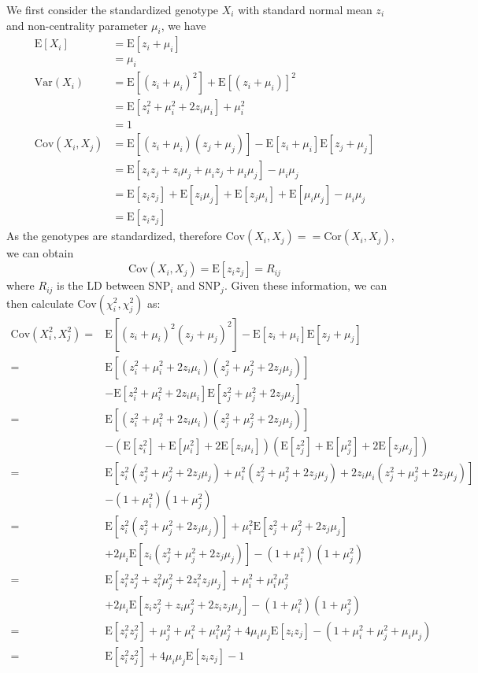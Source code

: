 			We first consider the standardized genotype $X_i$ with standard normal mean $z_i$ and non-centrality parameter
			$\mu_i$, we have
			\begin{align*}
				\mathrm{E}[X_i]&=\mathrm{E}[z_i+\mu_i]\\
				&=\mu_i\\
				\mathrm{Var}(X_i) &=\mathrm{E}[(z_i+\mu_i)^2]+\mathrm{E}[(z_i+\mu_i)]^2\\
				&=\mathrm{E}[z_i^2+\mu_i^2+2z_i\mu_i]+\mu_i^2\\
				&=1 \\
				\mathrm{Cov}(X_i,X_j)&=\mathrm{E}[(z_i+\mu_i)(z_j+\mu_j)]-\mathrm{E}[z_i+\mu_i]\mathrm{E}[z_j+\mu_j]\\
				&=\mathrm{E}[z_iz_j+z_i\mu_j+\mu_iz_j+\mu_i\mu_j]-\mu_i\mu_j\\
				&=\mathrm{E}[z_iz_j]+\mathrm{E}[z_i\mu_j]+\mathrm{E}[z_j\mu_i]+\mathrm{E}[\mu_i\mu_j]-\mu_i\mu_j\\
				&=\mathrm{E}[z_iz_j]
			\end{align*}
			As the genotypes are standardized, therefore $\mathrm{Cov}(X_i,X_j)==\mathrm{Cor}(X_i,X_j)$, we can obtain
			$$
				\mathrm{Cov}(X_i,X_j)=\mathrm{E}[z_iz_j]=R_{ij}
			$$
			where $R_{ij}$ is the \gls{LD} between \gls{SNP}$_i$ and \gls{SNP}$_j$.
			Given these information, we can then calculate $\mathrm{Cov}(\chi_i^2,\chi_j^2)$ as:
			\begin{align*}
				\mathrm{Cov}(X_i^2,X_j^2)=&\mathrm{E}[(z_i+\mu_i)^2(z_j+\mu_j)^2]-\mathrm{E}[z_i+\mu_i]\mathrm{E}[z_j+\mu_j]\\
				=&\mathrm{E}[(z_i^2+\mu_i^2+2z_i\mu_i)(z_j^2+\mu_j^2+2z_j\mu_j)] \\
				&-\mathrm{E}[z_i^2+\mu_i^2+2z_i\mu_i]\mathrm{E}[z_j^2+\mu_j^2+2z_j\mu_j]\\
				=&\mathrm{E}[(z_i^2+\mu_i^2+2z_i\mu_i)(z_j^2+\mu_j^2+2z_j\mu_j)]\\
				&-(\mathrm{E}[z_i^2]+\mathrm{E}[\mu_i^2]+2\mathrm{E}[z_i\mu_i])(\mathrm{E}[z_j^2]+\mathrm{E}[\mu_j^2]+2\mathrm{E}[z_j\mu_j])\\
				=&\mathrm{E}[z_i^2(z_j^2+\mu_j^2+2z_j\mu_j)+\mu_i^2(z_j^2+\mu_j^2+2z_j\mu_j)+2z_i\mu_i(z_j^2+\mu_j^2+2z_j\mu_j)]\\
				&-(1+\mu_i^2)(1+\mu_j^2)\\
				=&\mathrm{E}[z_i^2(z_j^2+\mu_j^2+2z_j\mu_j)]+\mu_i^2\mathrm{E}[z_j^2+\mu_j^2+2z_j\mu_j]\\
				&+2\mu_i\mathrm{E}[z_i(z_j^2+\mu_j^2+2z_j\mu_j)]-(1+\mu_i^2)(1+\mu_j^2)\\
				=&\mathrm{E}[z_i^2z_j^2+z_i^2\mu_j^2+2z_i^2z_j\mu_j]+\mu_i^2+\mu_i^2\mu_j^2\\
				&+2\mu_i\mathrm{E}[z_iz_j^2+z_i\mu_j^2+2z_iz_j\mu_j]-(1+\mu_i^2)(1+\mu_j^2)\\
				=&\mathrm{E}[z_i^2z_j^2]+\mu_j^2+\mu_i^2+\mu_i^2\mu_j^2+4\mu_i\mu_j\mathrm{E}[z_iz_j]-(1+\mu_i^2+\mu_j^2+\mu_i\mu_j)\\
				=&\mathrm{E}[z_i^2z_j^2]+4\mu_i\mu_j\mathrm{E}[z_iz_j]-1
			\end{align*}
